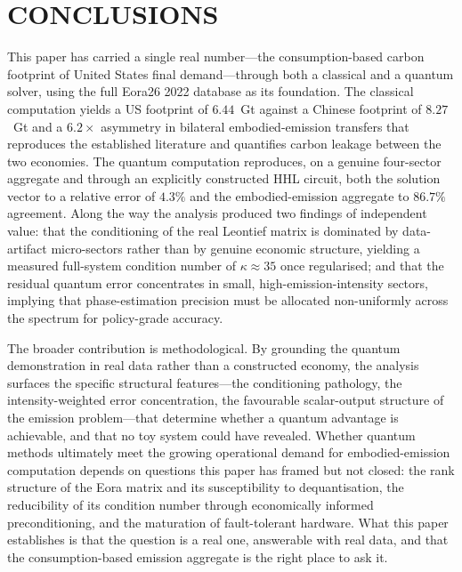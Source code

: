 \documentclass[letterpaper, 10 pt, conference]{ieeeconf}
\begin{document}
\section{CONCLUSIONS}

This paper has carried a single real number---the consumption-based carbon footprint of United States final demand---through both a classical and a quantum solver, using the full Eora26 2022 database as its foundation. The classical computation yields a US footprint of $6.44$~Gt against a Chinese footprint of $8.27$~Gt and a $6.2\times$ asymmetry in bilateral embodied-emission transfers that reproduces the established literature and quantifies carbon leakage between the two economies. The quantum computation reproduces, on a genuine four-sector aggregate and through an explicitly constructed HHL circuit, both the solution vector to a relative error of $4.3\%$ and the embodied-emission aggregate to $86.7\%$ agreement. Along the way the analysis produced two findings of independent value: that the conditioning of the real Leontief matrix is dominated by data-artifact micro-sectors rather than by genuine economic structure, yielding a measured full-system condition number of $\kappa\approx35$ once regularised; and that the residual quantum error concentrates in small, high-emission-intensity sectors, implying that phase-estimation precision must be allocated non-uniformly across the spectrum for policy-grade accuracy.\par

The broader contribution is methodological. By grounding the quantum demonstration in real data rather than a constructed economy, the analysis surfaces the specific structural features---the conditioning pathology, the intensity-weighted error concentration, the favourable scalar-output structure of the emission problem---that determine whether a quantum advantage is achievable, and that no toy system could have revealed. Whether quantum methods ultimately meet the growing operational demand for embodied-emission computation depends on questions this paper has framed but not closed: the rank structure of the Eora matrix and its susceptibility to dequantisation, the reducibility of its condition number through economically informed preconditioning, and the maturation of fault-tolerant hardware. What this paper establishes is that the question is a real one, answerable with real data, and that the consumption-based emission aggregate is the right place to ask it.
\end{document}
